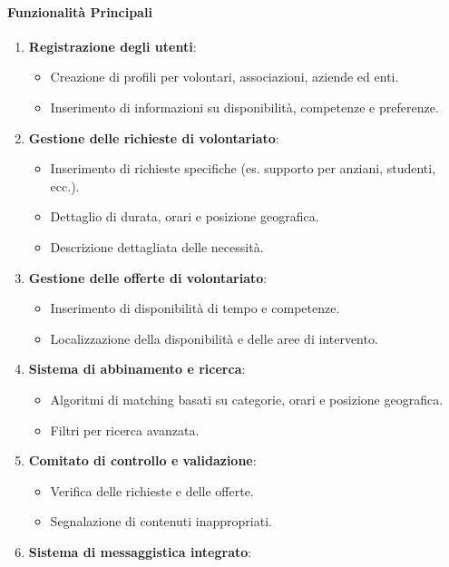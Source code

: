 \paragraph{Funzionalità Principali}
\begin{enumerate}
\item \textbf{Registrazione degli utenti}:
    \begin{itemize}
    \item Creazione di profili per volontari, associazioni, aziende ed enti.
    \item Inserimento di informazioni su disponibilità, competenze e preferenze.
    \end{itemize}
\item \textbf{Gestione delle richieste di volontariato}:
    \begin{itemize}
    \item Inserimento di richieste specifiche (es. supporto per anziani, studenti, ecc.).
    \item Dettaglio di durata, orari e posizione geografica.
    \item Descrizione dettagliata delle necessità.
    \end{itemize}
\item \textbf{Gestione delle offerte di volontariato}:
    \begin{itemize}
    \item Inserimento di disponibilità di tempo e competenze.
    \item Localizzazione della disponibilità e delle aree di intervento.
    \end{itemize}
\item \textbf{Sistema di abbinamento e ricerca}:
    \begin{itemize}
    \item Algoritmi di matching basati su categorie, orari e posizione geografica.
    \item Filtri per ricerca avanzata.
    \end{itemize}
\item \textbf{Comitato di controllo e validazione}:
    \begin{itemize}
    \item Verifica delle richieste e delle offerte.
    \item Segnalazione di contenuti inappropriati.
    \end{itemize}
\item \textbf{Sistema di messaggistica integrato}:
    \begin{itemize}

\end{itemize}
\end{enumerate}

